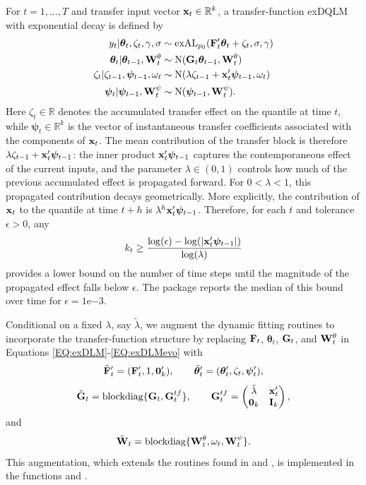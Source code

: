 \documentclass[jss]{jss}
\begin{document}
For $t=1,\dots,T$ and transfer input vector ${\bf x}_t \in \mathbb{R}^k$, a transfer-function exDQLM with exponential decay is defined by
\begin{align}
\label{EQ:begin_transfer}
y_t | \boldsymbol{\theta}_t,\zeta_t,\gamma,\sigma  & \sim \text{exAL}_{p_0}({\bf F}'_t \boldsymbol{\theta}_t +  \zeta_{t},\sigma,\gamma) \\
\boldsymbol{\theta}_t | \boldsymbol{\theta}_{t-1},{\bf W}_t^\theta  & \sim  \text{N}({\bf G}_t \boldsymbol{\theta}_{t-1},{\bf W}_t^\theta) \\
\label{EQ:transfer_effect}
\zeta_{t}|\zeta_{t-1},\boldsymbol{\psi}_{t-1},\omega_{t} & \sim \text{N}(\lambda \zeta_{t-1} + {\bf x}'_{t}\boldsymbol{\psi}_{t-1},\omega_{t}) \\
\label{EQ:end_transfer}
\boldsymbol{\psi}_{t}|\boldsymbol{\psi}_{t-1},{\bf W}_{t}^{\psi} & \sim \text{N}(\boldsymbol{\psi}_{t-1},{\bf W}_{t}^{\psi}).
\end{align}
Here $\zeta_t \in \mathbb{R}$ denotes the accumulated transfer effect on the quantile at time $t$, while $\boldsymbol{\psi}_t \in \mathbb{R}^k$ is the vector of instantaneous transfer coefficients associated with the components of ${\bf x}_t$. The mean contribution of the transfer block is therefore $\lambda \zeta_{t-1} + {\bf x}'_t \boldsymbol{\psi}_{t-1}$: the inner product ${\bf x}'_t \boldsymbol{\psi}_{t-1}$ captures the contemporaneous effect of the current inputs, and the parameter $\lambda\in(0,1)$ controls how much of the previous accumulated effect is propagated forward. For $0<\lambda<1$, this propagated contribution decays geometrically. More explicitly, the contribution of ${\bf x}_t$ to the quantile at time $t+h$ is $\lambda^h {\bf x}'_t \boldsymbol{\psi}_{t-1}$. Therefore, for each $t$ and tolerance $\epsilon>0$, any
\[
k_t \geq \frac{\log(\epsilon)-\log\!\left(|{\bf x}'_t \boldsymbol{\psi}_{t-1}|\right)}{\log(\lambda)}
\]
provides a lower bound on the number of time steps until the magnitude of the propagated effect falls below $\epsilon$. The package reports the median of this bound over time for $\epsilon = 1\mathrm{e}{-3}$.

Conditional on a fixed $\lambda$, say $\tilde\lambda$, we augment the dynamic fitting routines to incorporate the transfer-function structure by replacing ${\bf F}_t$, $\boldsymbol{\theta}_t$, ${\bf G}_t$, and ${\bf W}_t^\theta$ in Equations \eqref{EQ:exDLM}-\eqref{EQ:exDLMevo} with
\[
\tilde{\bf F}'_t = ({\bf F}'_t, 1, {\bf 0}'_k), \qquad
\tilde{\boldsymbol{\theta}}'_t = (\boldsymbol{\theta}'_t,\zeta_t,\boldsymbol{\psi}'_t),
\]
\[
\tilde{\bf G}_t = \text{blockdiag}\{{\bf G}_t, {\bf G}^{tf}_t\},
\qquad
{\bf G}^{tf}_t =
\begin{pmatrix}
\tilde\lambda & {\bf x}'_t \\
{\bf 0}_k & {\bf I}_k
\end{pmatrix},
\]
and
\[
\tilde{\bf W}_t = \text{blockdiag}\{{\bf W}_t^\theta,\omega_t,{\bf W}_t^\psi\}.
\]
This augmentation, which extends the routines found in  and , is implemented in the functions  and .
\end{document}
